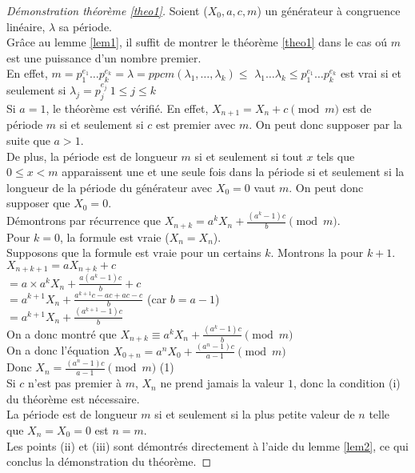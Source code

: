 \documentclass[a4paper,11pt]{report}
\begin{document}
	\begin{proof}[D\'emonstration th\'eor\`eme \ref{theo1}]
	Soient ($X_0, a, c, m$) un g\'en\'erateur \`a congruence lin\'eaire, $\lambda$ sa p\'eriode.\\	
	
	Gr\^ace au lemme \ref{lem1}, il suffit de montrer le th\'eor\`eme \ref{theo1} dans le cas o\'u $m$ %
	est une puissance d'un nombre premier.\\
	En effet, $m=p_1^{e_1}\ldots p_k^{e_k}=\lambda=ppcm(\lambda_1, \ldots, \lambda_k)\leq $%
	$\lambda_1\ldots\lambda_k\leq p_1^{e_1}\ldots p_k^{e_k}$ est vrai si et seulement si %
	$\lambda_j=p_j^{e_j}~1\leq j\leq k$\\
	
	Si $a=1$, le th\'eor\`eme est v\'erifi\'e. En effet, $X_{n+1}=X_n + c \pmod{m}$ est de p\'eriode $m$ %
	si et seulement si $c$ est premier avec $m$. On peut donc supposer par la suite que $a>1$.\\
	
	De plus, la p\'eriode est de longueur $m$ si et seulement si tout $x$ tels que $0\leq x< m$ %
	apparaissent une et une seule fois dans la p\'eriode si et seulement si la longueur de la p\'eriode du g\'en\'erateur avec $X_0=0$ vaut $m$. On peut donc supposer que $X_0=0$.\\
	
	D\'emontrons par r\'ecurrence que $X_{n+k}=a^kX_n + \frac{(a^k-1)c}{b} \pmod{m}$.\\	
	Pour $k=0$, la formule est vraie ($X_n=X_n$).\\
	Supposons que la formule est vraie pour un certains $k$. Montrons la pour $k+1$.\\
	$X_{n+k+1}=aX_{n+k} + c$\\
	$=a\times a^kX_n + \frac{a(a^k-1)c}{b} + c$\\
	$=a^{k+1}X_n + \frac{a^{k+1}c -ac +ac -c}{b}$ (car $b=a-1$)\\
	$=a^{k+1}X_n + \frac{(a^{k+1}-1)c}{b}$\\
	
	On a donc montr\'e que $X_{n+k}\equiv a^kX_n + \frac{(a^k-1)c}{b} \pmod{m}$\\
	
	
	On a donc l'\'equation $X_{0+n}=a^nX_0 + \frac{(a^n-1)c}{a-1} \pmod{m}$\\
	Donc $X_n=\frac{(a^n-1)c}{a-1} \pmod{m}$ (1)\\
	
	Si $c$ n'est pas premier \`a $m$, $X_n$ ne prend jamais la valeur $1$, donc la condition (i) %
	du th\'eor\`eme est n\'ecessaire.\\
	
	La p\'eriode est de longueur $m$ si et seulement si la plus petite valeur de $n$ telle que %
	$X_n=X_0=0$ est $n=m$. \\
	Les points (ii) et (iii) sont d\'emontr\'es directement \`a l'aide du lemme \ref{lem2}, ce qui conclus la d\'emonstration du th\'eor\`eme.
	
	
	\end{proof}
	
\end{document}
